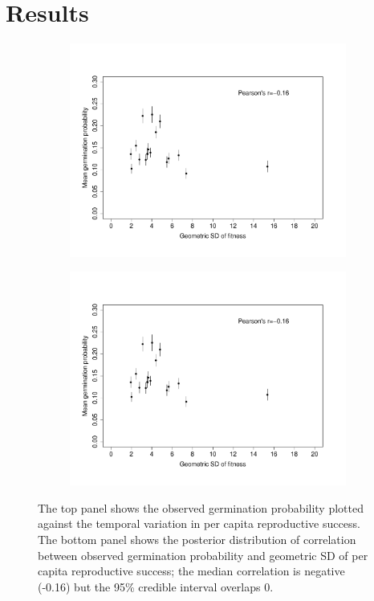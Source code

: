\documentclass[12pt, oneside, titlepage]{article}   	%
\begin{document}
\section*{Results}

\begin{figure}
\centering
\begin{subfigure}[h]{.65\textwidth}
\centering
       \includegraphics[page=1,width=1\textwidth]{../figures/germ_rs_correlation.pdf}  
\end{subfigure}
\begin{subfigure}[h]{.9\textwidth}
\centering
       \includegraphics[page=2,width=1\textwidth]{../figures/germ_rs_correlation.pdf}  
\end{subfigure}
 \caption{ The top panel shows the observed germination probability plotted against the temporal variation in per capita reproductive success. The bottom panel shows the posterior distribution of correlation between observed germination probability and geometric SD of per capita reproductive success; the median correlation is negative (-0.16) but the 95\% credible interval overlaps 0. }
   \label{fig:germ_rs_correlation}
 \end{figure}
\end{document}
